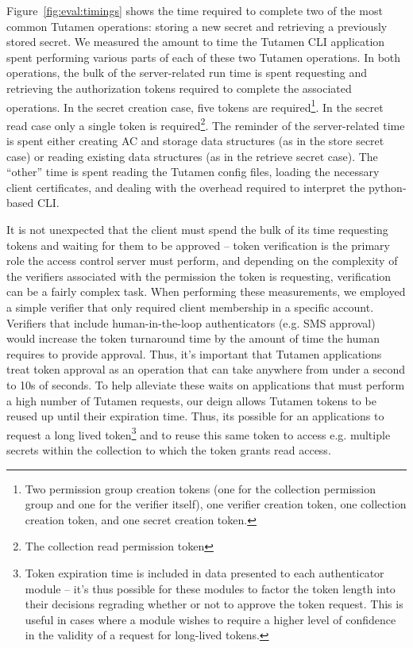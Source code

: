 Figure~\ref{fig:eval:timings} shows the time required to complete two
of the most common Tutamen operations: storing a new secret and
retrieving a previously stored secret. We measured the amount to time
the Tutamen CLI application spent performing various parts of each of
these two Tutamen operations. In both operations, the bulk of the
server-related run time is spent requesting and retrieving the
authorization tokens required to complete the associated
operations. In the secret creation case, five tokens are
required\footnote{Two permission group creation tokens (one for the
  collection permission group and one for the verifier itself), one
  verifier creation token, one collection creation token, and one
  secret creation token.}. In the secret read case only a single token
is required\footnote{The collection read permission token}. The
reminder of the server-related time is spent either creating AC and
storage data structures (as in the store secret case) or reading
existing data structures (as in the retrieve secret case). The
``other'' time is spent reading the Tutamen config files, loading the
necessary client certificates, and dealing with the overhead required
to interpret the python-based CLI.

It is not unexpected that the client must spend the bulk of its time
requesting tokens and waiting for them to be approved -- token
verification is the primary role the access control server must
perform, and depending on the complexity of the verifiers associated
with the permission the token is requesting, verification can be a
fairly complex task. When performing these measurements, we employed a
simple verifier that only required client membership in a specific
account. Verifiers that include human-in-the-loop authenticators
(e.g. SMS approval) would increase the token turnaround time by the
amount of time the human requires to provide approval. Thus, it's
important that Tutamen applications treat token approval as an
operation that can take anywhere from under a second to 10s of
seconds. To help alleviate these waits on applications that must
perform a high number of Tutamen requests, our deign allows Tutamen
tokens to be reused up until their expiration time. Thus, its possible
for an applications to request a long lived token\footnote{Token
  expiration time is included in data presented to each authenticator
  module -- it's thus possible for these modules to factor the token
  length into their decisions regrading whether or not to approve the
  token request. This is useful in cases where a module wishes to
  require a higher level of confidence in the validity of a request
  for long-lived tokens.} and to reuse this same token to access
e.g. multiple secrets within the collection to which the token grants
read access.
 
